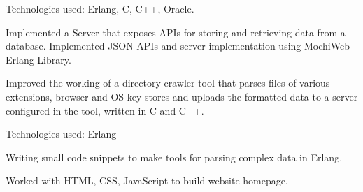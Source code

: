 \documentclass[]{deedy-resume-openfont}
\begin{document}
\begin{minipage}[t]{0.64\textwidth}
\begin{tightemize}\item Technologies used: Erlang, C, C++, Oracle.
\item Implemented a Server that exposes APIs for storing and retrieving data from a database. Implemented JSON APIs and server implementation using MochiWeb Erlang Library.
\item Improved the working of a directory crawler tool that parses files of various extensions, browser and OS key stores and uploads the formatted data to a server configured in the tool, written in C and C++.
\end{tightemize}
\sectionsep

\begin{tightemize}
\item Technologies used: Erlang
\item  Writing small code snippets to make tools for parsing complex data in Erlang.\end{tightemize}
\sectionsep

\begin{tightemize}
\item Worked with HTML, CSS, JavaScript to build website homepage.\end{tightemize}
\sectionsep
\end{minipage} 
\end{document}
